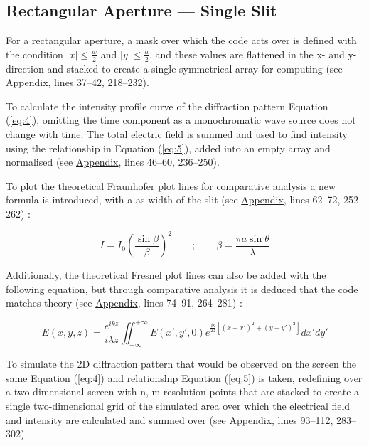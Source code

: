 \documentclass[12pt]{article}
\begin{document}
\subsection{Rectangular Aperture — Single Slit}

For a rectangular aperture, a mask over which the code acts over is defined with the condition \( \lvert x \rvert \leq \frac{w}{2} \) and \( \lvert y \rvert \leq \frac{h}{2} \), 
and these values are flattened in the x- and y-direction and stacked to create a single symmetrical array for computing (see \hyperref[sec:A]{Appendix}, lines 37–42, 218–232).

To calculate the intensity profile curve of the diffraction pattern Equation (\ref{eq:4}), omitting the time component as a monochromatic wave source does not change with time.
The total electric field is summed and used to find intensity using the relationship in Equation (\ref{eq:5}), added into an empty array and normalised (see \hyperref[sec:A]{Appendix}, lines 46–60, 236–250).

To plot the theoretical Fraunhofer plot lines for comparative analysis a new formula is introduced, with a as width of the slit (see \hyperref[sec:A]{Appendix}, lines 62–72, 252–262) \cite{openstax3}:

\begin{equation} \label{eq:6}
    I = I_0 \left( \frac{\sin \beta}{\beta} \right) ^2 \qquad ; \qquad \beta = \frac{\pi a \sin \theta}{\lambda}
\end{equation}

Additionally, the theoretical Fresnel plot lines can also be added with the following equation, but through comparative analysis it is deduced that the code matches theory (see \hyperref[sec:A]{Appendix}, lines 74–91, 264–281) \cite{enwiki:1314266286}:

\begin{equation} \label{eq:7}
    E(x,y,z) = \frac{e^{ikz}}{i\lambda z} \iint_{-\infty}^{+ \infty} E(x',y',0) e^{\frac{ik}{2z}\left[ (x-x')^2 + (y-y')^2 \right]} dx' dy'
\end{equation}

To simulate the 2D diffraction pattern that would be observed on the screen the same Equation (\ref{eq:4}) and relationship Equation (\ref{eq:5}) is taken,
redefining over a two-dimensional screen with n, m resolution points that are stacked to create a single two-dimensional grid of the simulated area over which the electrical field and intensity
are calculated and summed over (see \hyperref[sec:A]{Appendix}, lines 93–112, 283–302).
\end{document}
